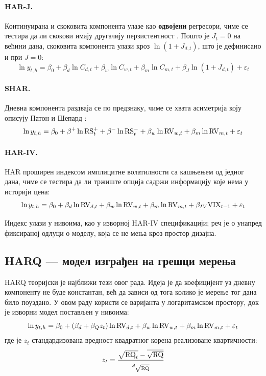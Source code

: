 \paragraph{HAR-J.}
Континуирана и скоковита компонента улазе као \textbf{одвојени} регресори, чиме се
тестира да ли скокови имају другачију перзистентност \parencite{abd2007}. Пошто је
$J_t = 0$ на већини дана, скоковита компонента улази кроз $\ln(1 + J_{d,t})$, што је
дефинисано и при $J = 0$:
\begin{equation}
\ln y_{t,h} = \beta_0 + \beta_d \ln C_{d,t} + \beta_w \ln C_{w,t} + \beta_m \ln C_{m,t}
+ \beta_J \ln\!\left(1 + J_{d,t}\right) + \varepsilon_t
\end{equation}

\paragraph{SHAR.}
Дневна компонента раздваја се по предзнаку, чиме се хвата асиметрија коју описују
Патон и Шепард \parencite{pattonSheppard2015}:
\begin{equation}
\ln y_{t,h} = \beta_0 + \beta^{+}\ln\mathrm{RS}_{t}^{+} + \beta^{-}\ln\mathrm{RS}_{t}^{-}
+ \beta_w \ln\mathrm{RV}_{w,t} + \beta_m \ln\mathrm{RV}_{m,t} + \varepsilon_t
\end{equation}

\paragraph{HAR-IV.}
HAR проширен индексом имплицитне волатилности са кашњењем од једног дана, чиме се
тестира да ли тржиште опција садржи информацију које нема у историји цена:
\begin{equation}
\ln y_{t,h} = \beta_0 + \beta_d \ln\mathrm{RV}_{d,t} + \beta_w \ln\mathrm{RV}_{w,t} + \beta_m \ln\mathrm{RV}_{m,t}
+ \beta_{IV}\mathrm{VIX}_{t-1} + \varepsilon_t
\end{equation}

Индекс улази у нивоима, као у изворној HAR-IV спецификацији; реч је о унапред
фиксираној одлуци о моделу, која се не мења кроз простор дизајна.

\subsection{HARQ — модел изграђен на грешци мерења}
\label{subsec:harq}

HARQ \parencite{bpq2016} теоријски је најближи тези овог рада. Идеја је да коефицијент
уз дневну компоненту не буде константан, већ да зависи од тога колико је мерење тог
дана било поуздано. У овом раду користи се варијанта у логаритамском простору, док је
изворни модел постављен у нивоима:
\begin{equation}
\ln y_{t,h} = \beta_0 + \left(\beta_d + \beta_Q z_t\right)\ln\mathrm{RV}_{d,t}
+ \beta_w \ln\mathrm{RV}_{w,t} + \beta_m \ln\mathrm{RV}_{m,t} + \varepsilon_t
\label{eq:harq}
\end{equation}
где је $z_t$ стандардизована вредност квадратног корена реализоване квартичности:
\begin{equation}
z_t = \frac{\sqrt{\mathrm{RQ}_t} - \overline{\sqrt{\mathrm{RQ}}}}{s_{\sqrt{\mathrm{RQ}}}}
\end{equation}

